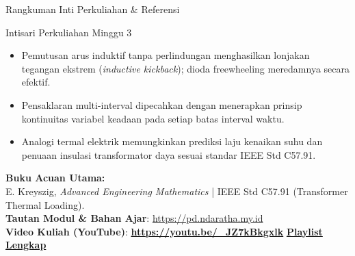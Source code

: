 \documentclass[aspectratio=169,10pt]{beamer}
\begin{document}
\begin{frame}{Rangkuman Inti Perkuliahan \& Referensi}
  \begin{exampleblock}{Intisari Perkuliahan Minggu 3}
    \begin{itemize}
      \item Pemutusan arus induktif tanpa perlindungan menghasilkan lonjakan tegangan ekstrem (\textit{inductive kickback}); dioda freewheeling meredamnya secara efektif.
      \item Pensaklaran multi-interval dipecahkan dengan menerapkan prinsip kontinuitas variabel keadaan pada setiap batas interval waktu.
      \item Analogi termal elektrik memungkinkan prediksi laju kenaikan suhu dan penuaan insulasi transformator daya sesuai standar IEEE Std C57.91.
    \end{itemize}
  \end{exampleblock}
  \vspace{0.2cm}
  \begin{center}
    \small \textbf{Buku Acuan Utama:} \\
    E. Kreyszig, \textit{Advanced Engineering Mathematics} | IEEE Std C57.91 (Transformer Thermal Loading). \\
    \vspace{0.3cm}
    \textbf{Tautan Modul \& Bahan Ajar}: \url{https://pd.ndaratha.my.id} \\[0.12cm]
    \textbf{Video Kuliah (YouTube)}: {\color{red!85!black}\textbf{\url{https://youtu.be/_JZ7kBkgxlk}}} \quad \textbar \quad \href{https://www.youtube.com/playlist?list=PLS5oOZWXZeTw}{\color{unibblue}\textbf{Playlist Lengkap}}
  \end{center}
\end{frame}
\end{document}
